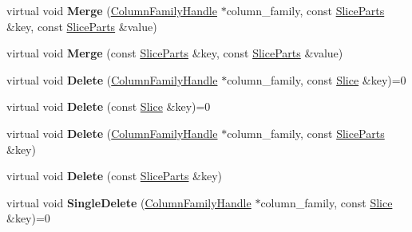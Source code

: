 \begin{DoxyCompactItemize}
\item 
virtual void {\bfseries Merge} (\hyperlink{classrocksdb_1_1ColumnFamilyHandle}{Column\+Family\+Handle} $\ast$column\+\_\+family, const \hyperlink{structrocksdb_1_1SliceParts}{Slice\+Parts} \&key, const \hyperlink{structrocksdb_1_1SliceParts}{Slice\+Parts} \&value)\hypertarget{classrocksdb_1_1WriteBatchBase_a4a8c9832e1ddd492994359467d246f36}{}\label{classrocksdb_1_1WriteBatchBase_a4a8c9832e1ddd492994359467d246f36}

\item 
virtual void {\bfseries Merge} (const \hyperlink{structrocksdb_1_1SliceParts}{Slice\+Parts} \&key, const \hyperlink{structrocksdb_1_1SliceParts}{Slice\+Parts} \&value)\hypertarget{classrocksdb_1_1WriteBatchBase_ad1cdadaa5ca055cb392142438761f198}{}\label{classrocksdb_1_1WriteBatchBase_ad1cdadaa5ca055cb392142438761f198}

\item 
virtual void {\bfseries Delete} (\hyperlink{classrocksdb_1_1ColumnFamilyHandle}{Column\+Family\+Handle} $\ast$column\+\_\+family, const \hyperlink{classrocksdb_1_1Slice}{Slice} \&key)=0\hypertarget{classrocksdb_1_1WriteBatchBase_abc878dff1f1c20eb6606bd7a3478507a}{}\label{classrocksdb_1_1WriteBatchBase_abc878dff1f1c20eb6606bd7a3478507a}

\item 
virtual void {\bfseries Delete} (const \hyperlink{classrocksdb_1_1Slice}{Slice} \&key)=0\hypertarget{classrocksdb_1_1WriteBatchBase_a3fd0c990df4df69d8c9d6a86dc630cf9}{}\label{classrocksdb_1_1WriteBatchBase_a3fd0c990df4df69d8c9d6a86dc630cf9}

\item 
virtual void {\bfseries Delete} (\hyperlink{classrocksdb_1_1ColumnFamilyHandle}{Column\+Family\+Handle} $\ast$column\+\_\+family, const \hyperlink{structrocksdb_1_1SliceParts}{Slice\+Parts} \&key)\hypertarget{classrocksdb_1_1WriteBatchBase_aebc5a920bc370fde05adb1f312fffb03}{}\label{classrocksdb_1_1WriteBatchBase_aebc5a920bc370fde05adb1f312fffb03}

\item 
virtual void {\bfseries Delete} (const \hyperlink{structrocksdb_1_1SliceParts}{Slice\+Parts} \&key)\hypertarget{classrocksdb_1_1WriteBatchBase_afdb58e7347a6bf7f7d06718a56a1f2c2}{}\label{classrocksdb_1_1WriteBatchBase_afdb58e7347a6bf7f7d06718a56a1f2c2}

\item 
virtual void {\bfseries Single\+Delete} (\hyperlink{classrocksdb_1_1ColumnFamilyHandle}{Column\+Family\+Handle} $\ast$column\+\_\+family, const \hyperlink{classrocksdb_1_1Slice}{Slice} \&key)=0\hypertarget{classrocksdb_1_1WriteBatchBase_ae2806338280cb4963e89f04c185104a9}{}\label{classrocksdb_1_1WriteBatchBase_ae2806338280cb4963e89f04c185104a9}


\end{DoxyCompactItemize}

